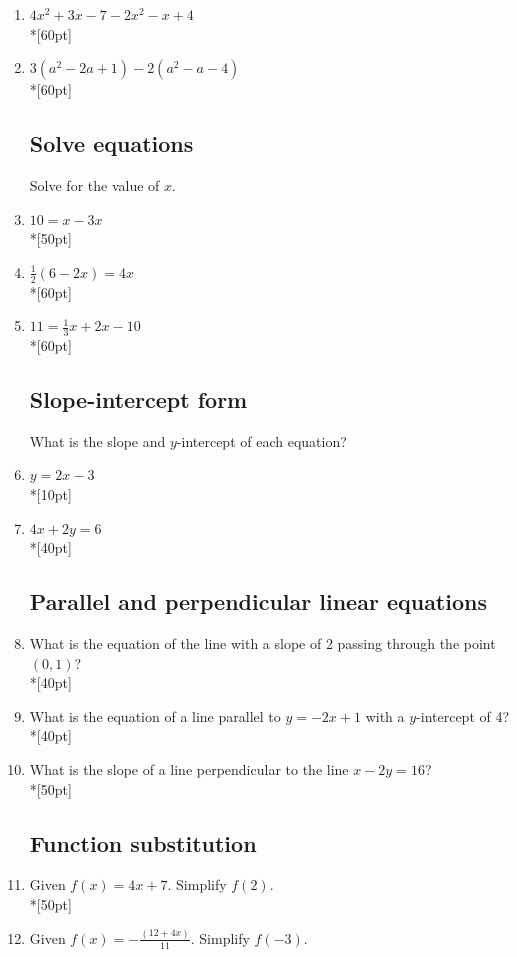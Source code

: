 \documentclass[]{book}
\begin{document}
\begin{enumerate}

\item $4x^2+3x -7 -2x^2-x+4$\\*[60pt]
\item $3(a^2-2a +1) -2(a^2-a-4)$\\*[60pt]

\subsection*{Solve equations}

Solve for the value of $x$.
\item   $10=x-3x$\\*[50pt]
\item   $\frac{1}{2}(6-2x)=4x$\\*[60pt]
\item   $11=\frac{1}{3}x+2x-10$\\*[60pt]

\newpage
\subsection*{Slope-intercept form}

What is the slope and $y$-intercept of each equation? 
\item   $y=2x-3$\\*[10pt]
\item   $4x+2y=6$\\*[40pt]


\subsection*{Parallel and perpendicular linear equations}

\item What is the equation of the line with a slope of 2 passing through the point $(0,1)$?\\*[40pt]
\item What is the equation of a line parallel to $y=-2x+1$ with a $y$-intercept of 4?\\*[40pt]
\item What is the slope of a line perpendicular to the line $x-2y=16$?\\*[50pt]

\subsection*{Function substitution}
\item Given $f(x)=4x+7$. Simplify $f(2)$.\\*[50pt]
\item Given $\displaystyle f(x)=-\frac{(12+4x)}{11}$. Simplify $f(-3)$.


\end{enumerate}
\end{document}
